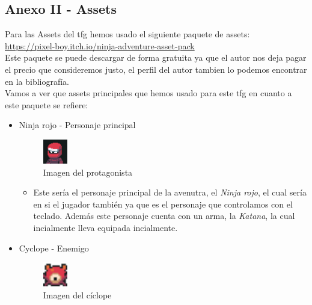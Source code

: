 \documentclass[a4paper]{article}
\begin{document}
\begin{appendices}
    \section{Anexo II - Assets}
    Para las Assets del tfg hemos usado el siguiente paquete de assets: \\
    \url{https://pixel-boy.itch.io/ninja-adventure-asset-pack} \\
    Este paquete se puede descargar de forma gratuita ya que el autor nos deja pagar el precio que consideremos justo, el perfil del autor tambien lo podemos encontrar en la bibliografía. \\
    Vamos a ver que assets principales que hemos usado para este tfg en cuanto a este paquete se refiere:
    \begin{itemize}
        \item Ninja rojo - Personaje principal
              \begin{figure}[ht]
                  \centering
                  \includegraphics[width=0.1\textwidth]{Images/FacesetPlayer.png}
                  \caption{Imagen del protagonista}
                  \label{fig:player}
              \end{figure}
              \begin{itemize}
                  \item Este sería el personaje principal de la avenutra, el \textit{Ninja rojo}, el cual sería en si el jugador también ya que es el personaje que controlamos con el teclado. Además este
                        personaje cuenta con un arma, la \textit{Katana}, la cual incialmente lleva equipada incialmente.
              \end{itemize}
        \item Cyclope - Enemigo
              \begin{figure}[ht]
                  \centering
                  \includegraphics[width=0.1\textwidth]{Images/monster1.png}
                  \caption{Imagen del cíclope}
                  \label{fig:ciclope}
              \end{figure}
              \begin{itemize}

\end{itemize}
\end{itemize}
\end{appendices}
\end{document}
